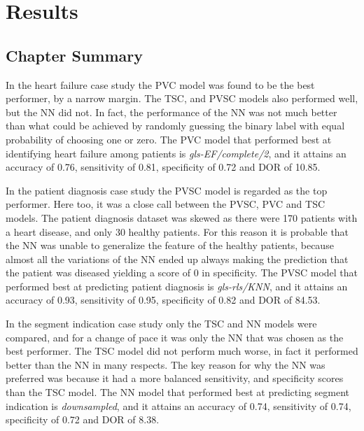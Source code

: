 \chapter{Results} \label{chap:results}





\newpage
\section{Chapter Summary}

In the heart failure case study the PVC model was found to be the best performer, by a narrow margin. 
The TSC, and PVSC models also performed well, but the NN did not. In fact, the performance of the NN was not much better 
than what could be achieved by randomly guessing the binary label with equal probability of choosing one or zero. 
The PVC model that performed best at identifying heart failure among patients is \textit{gls-EF/complete/2}, and it attains an 
accuracy of 0.76, sensitivity of 0.81, specificity of 0.72 and DOR of 10.85. \medskip

In the patient diagnosis case study the PVSC model is regarded as the top performer.
Here too, it was a close call between the PVSC, PVC and TSC models.
The patient diagnosis dataset was skewed as there were 170 patients with a heart disease, and only 30 healthy patients. 
For this reason it is probable that the NN was unable to generalize the feature of the healthy patients, 
because almost all the variations of the NN ended up always making the prediction that the patient was diseased yielding a score of 0 in specificity. \smallskip
The PVSC model that performed best at predicting patient diagnosis is \textit{gls-rls/KNN}, and it attains an
accuracy of 0.93, sensitivity of 0.95, specificity of 0.82 and DOR of 84.53. \medskip

In the segment indication case study only the TSC and NN models were compared, and for a change of pace it was only the NN that was chosen as the best performer. 
The TSC model did not perform much worse, in fact it performed better than the NN in many respects. 
The key reason for why the NN was preferred was because it had a more balanced sensitivity, and specificity scores than the TSC model. 
The NN model that performed best at predicting segment indication is \textit{downsampled}, and it attains an
accuracy of 0.74, sensitivity of 0.74, specificity of 0.72 and DOR of 8.38. 
